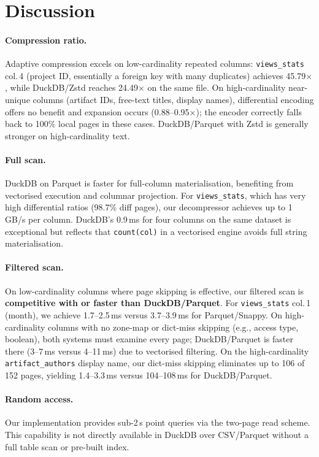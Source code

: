 \documentclass[a4paper,11pt]{article}
\begin{document}
\section{Discussion}

\paragraph{Compression ratio.}
Adaptive compression excels on low-cardinality repeated columns:
\texttt{views\_stats} col.\,4 (project ID, essentially a foreign key
with many duplicates) achieves 45.79$\times$, while DuckDB/Zstd reaches
24.49$\times$ on the same file. On high-cardinality near-unique columns
(artifact IDs, free-text titles, display names), differential encoding
offers no benefit and expansion occurs (0.88--0.95$\times$); the encoder
correctly falls back to 100\% local pages in these cases. DuckDB/Parquet
with Zstd is generally stronger on high-cardinality text.

\paragraph{Full scan.}
DuckDB on Parquet is faster for full-column materialisation, benefiting
from vectorised execution and columnar projection. For
\texttt{views\_stats}, which has very high differential ratios
(98.7\% diff pages), our decompressor achieves up to 1\,GB/s per column.
DuckDB's 0.9\,ms for four columns on the same dataset is exceptional but
reflects that \texttt{count(col)} in a vectorised engine avoids full
string materialisation.

\paragraph{Filtered scan.}
On low-cardinality columns where page skipping is effective, our filtered
scan is \textbf{competitive with or faster than DuckDB/Parquet}.
For \texttt{views\_stats} col.\,1 (month), we achieve 1.7--2.5\,ms
versus 3.7--3.9\,ms for Parquet/Snappy. On high-cardinality columns with
no zone-map or dict-miss skipping (e.g., access type, boolean), both
systems must examine every page; DuckDB/Parquet is faster there (3--7\,ms
versus 4--11\,ms) due to vectorised filtering. On the high-cardinality
\texttt{artifact\_authors} display name, our dict-miss skipping eliminates
up to 106 of 152 pages, yielding 1.4--3.3\,ms versus
104--108\,ms for DuckDB/Parquet.

\paragraph{Random access.}
Our implementation provides sub-2\,\textmu{}s point queries via the
two-page read scheme. This capability is not directly available in
DuckDB over CSV/Parquet without a full table scan or pre-built index.
\end{document}
